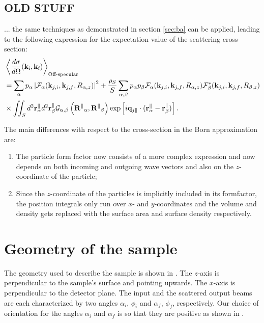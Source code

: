 \subsection{OLD STUFF}

... the same techniques as demonstrated in section \ref{sec:ba} can be applied, leading to the following expression for the expectation value of the scattering cross-section:
\begin{align*}
  & \left\langle \frac{d\sigma}{d\Omega}(\mathbf{k}_\text{i},\mathbf{k}_\text{f}) \right\rangle_{\text{Off-specular}}  \\
  & = \sum_\alpha p_\alpha \left\lvert \mathcal{F}_\alpha(\mathbf{k}_{j,i},\mathbf{k}_{j,f}, R_{\alpha,z})\right\rvert ^2 + \frac{\rho_S}{S}\sum_{\alpha,\beta} p_\alpha p_\beta \mathcal{F}_\alpha (\mathbf{k}_{j,i},\mathbf{k}_{j,f}, R_{\alpha,z})\mathcal{F}_\beta^*(\mathbf{k}_{j,i},\mathbf{k}_{j,f}, R_{\beta,z}) \\
  & \times \iint_S d^2\mathbf{r}_\alpha^\parallel d^2\mathbf{r}_\beta^\parallel \mathcal{G}_{\alpha ,\beta}\left( \mathbf{R^\parallel}_{\alpha} , \mathbf{R^\parallel}_{\beta} \right) \exp \left[ i\mathbf{q}_{j\parallel}\cdot (\mathbf{r}_\alpha^\parallel - \mathbf{r}_\beta^\parallel ) \right].
\end{align*}

The main differences with respect to the cross-section in the Born approximation are:
\begin{enumerate}
  \item The particle form factor now consists of a more complex expression and now depends on both incoming and outgoing wave vectors and also on the $z$-coordinate of the particle;
  \item Since the $z$-coordinate of the particles is implicitly included in its formfactor, the position integrals only run over $x$- and $y$-coordinates and the volume and density gets replaced with the surface area and surface density respectively.
\end{enumerate}

\section{Geometry of the sample}

\noindent The geometry used to describe the sample is shown in . The $z$-axis is perpendicular to the sample's
surface and pointing upwards. The $x$-axis  is perpendicular to the
detector plane. The input and the
scattered output beams are each characterized by two angles
$\alpha_i$, $\phi_i$ and $\alpha_f$, $\phi_f$, respectively. Our choice of orientation for the
angles $\alpha_i$ and $\alpha_f$ is so that they are positive as shown in . \\

